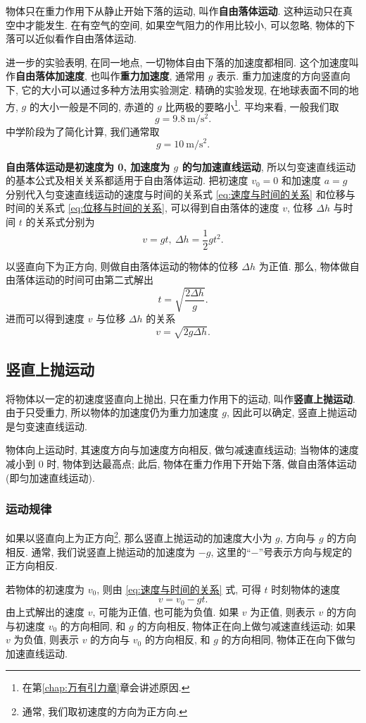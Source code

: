 \documentclass[UTF8,openany,fontset=fandol]{ctexbook}
\theoremstyle{chinesetextbook}
\newcommand{\unit}[1]{\ \mathrm{#1}}
\begin{document}
物体只在重力作用下从静止开始下落的运动, 叫作\textbf{自由落体运动}. 这种运动只在真空中才能发生. 在有空气的空间, 如果空气阻力的作用比较小, 可以忽略, 物体的下落可以近似看作自由落体运动.

进一步的实验表明, 在同一地点, 一切物体自由下落的加速度都相同. 这个加速度叫作\textbf{自由落体加速度}, 也叫作\textbf{重力加速度}, 通常用 $g$ 表示. 重力加速度的方向竖直向下, 它的大小可以通过多种方法用实验测定. 精确的实验发现, 在地球表面不同的地方, $g$ 的大小一般是不同的, 赤道的 $g$ 比两极的要略小\footnote{在第\ref{chap:万有引力章}章会讲述原因.}. 平均来看, 一般我们取
\[
g=9.8\unit{m/s^2}.
\]
中学阶段为了简化计算, 我们通常取
\[
g=10\unit{m/s^2}.
\]

\textbf{自由落体运动是初速度为 0, 加速度为 $g$ 的匀加速直线运动}, 所以匀变速直线运动的基本公式及相关关系都适用于自由落体运动. 把初速度 $v_0=0$ 和加速度 $a=g$ 分别代入匀变速直线运动的速度与时间的关系式 \eqref{eq:速度与时间的关系} 和位移与时间的关系式 \eqref{eq:位移与时间的关系}, 可以得到自由落体的速度 $v$, 位移 $\Delta h$ 与时间 $t$ 的关系式分别为
\[
v=gt,\ \Delta h=\frac12gt^2.
\]

以竖直向下为正方向, 则做自由落体运动的物体的位移 $\Delta h$ 为正值. 那么, 物体做自由落体运动的时间可由第二式解出
\[
t=\sqrt{\frac{2\Delta h}{g}}.
\]
进而可以得到速度 $v$ 与位移 $\Delta h$ 的关系
\[
v=\sqrt{2g\Delta h}.
\]
\subsection{竖直上抛运动}
将物体以一定的初速度竖直向上抛出, 只在重力作用下的运动, 叫作\textbf{竖直上抛运动}. 由于只受重力, 所以物体的加速度仍为重力加速度 $g$, 因此可以确定, 竖直上抛运动是匀变速直线运动.

物体向上运动时, 其速度方向与加速度方向相反, 做匀减速直线运动; 当物体的速度减小到 0 时, 物体到达最高点; 此后, 物体在重力作用下开始下落, 做自由落体运动 (即匀加速直线运动).
\subsubsection{运动规律}
如果以竖直向上为正方向\footnote{通常, 我们取初速度的方向为正方向.}, 那么竖直上抛运动的加速度大小为 $g$, 方向与 $g$ 的方向相反. 通常, 我们说竖直上抛运动的加速度为 $-g$, 这里的“$-$”号表示方向与规定的正方向相反.

若物体的初速度为 $v_0$, 则由 \eqref{eq:速度与时间的关系} 式, 可得 $t$ 时刻物体的速度
\begin{equation}\label{eq:竖直上抛1}
v=v_0-gt.
\end{equation}
由上式解出的速度 $v$, 可能为正值, 也可能为负值. 如果 $v$ 为正值, 则表示 $v$ 的方向与初速度 $v_0$ 的方向相同, 和 $g$ 的方向相反, 物体正在向上做匀减速直线运动; 如果 $v$ 为负值, 则表示 $v$ 的方向与 $v_0$ 的方向相反, 和 $g$ 的方向相同, 物体正在向下做匀加速直线运动.
\end{document}

